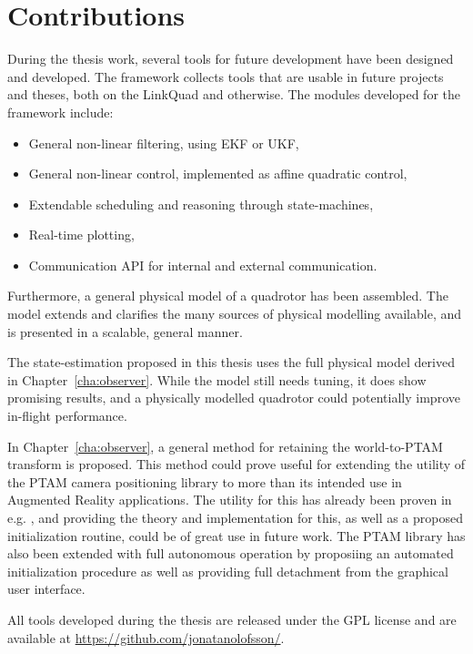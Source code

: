 \section{Contributions}
    During the thesis work, several tools for future development have been
    designed and developed. The \crap framework collects tools that are usable in future
    projects and theses, both on the LinkQuad and otherwise.
    The modules developed for the \crap framework include:
    \begin{itemize}
        \item General non-linear filtering, using EKF or UKF,
        \item General non-linear control, implemented as affine quadratic control,
        \item Extendable scheduling and reasoning through state-machines,
        \item Real-time plotting,
        \item Communication API for internal and external communication.
    \end{itemize}

    Furthermore, a general physical model of a quadrotor has been assembled.
    The model extends and clarifies the many sources of physical modelling
    available, and is presented in a scalable, general manner.

    The state-estimation proposed in this thesis uses the full physical model
    derived in Chapter~\ref{cha:observer}. While the model still needs
    tuning, it does show promising results, and a physically modelled
    quadrotor could potentially improve in-flight performance.

    In Chapter~\ref{cha:observer}, a general method for retaining
    the world-to-PTAM transform is proposed.
    This method could prove useful for extending the utility of the PTAM
    camera positioning library to more than its intended use in Augmented Reality applications.
    The utility for this has already been proven in e.g. \citep{weiss11monocular},
    and providing the theory and implementation for this, as well as a proposed
    initialization routine, could be of great use in future work.
    The PTAM library has also been extended with full autonomous operation by
    proposiing an automated initialization procedure as well as providing
    full detachment from the graphical user interface.

    All tools developed during the thesis are released under the GPL license
    and are available at \url{https://github.com/jonatanolofsson/}.

